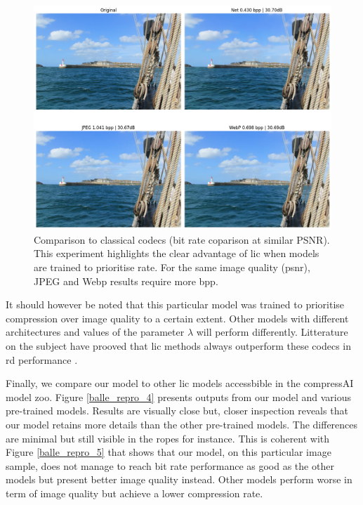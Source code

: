 \begin{figure}
    \centering
    \includegraphics[width=15cm]{img/balle_repro_psnr.png}
    \caption[Comparison to classical codecs (bit rate coparison at similar PSNR).]{Comparison to classical codecs (bit rate coparison at similar PSNR). This experiment highlights the clear advantage of \acrshort{lic} when models are trained to prioritise rate. For the same image quality (\acrshort{psnr}), JPEG and Webp results require more \acrshort{bpp}.}
    \label{balle_repro_3}
\end{figure}

It should however be noted that this particular model was trained to prioritise compression over image quality to a certain extent. Other models with different architectures and values of the parameter \(\lambda\) will perform differently. Litterature on the subject have prooved that \acrshort{lic} methods always outperform these codecs in \acrshort{rd} performance \cite{ballé2018variationalimagecompressionscale}.

Finally, we compare our model to other \acrshort{lic} models accessbible in the compressAI model zoo. Figure \ref{balle_repro_4} presents outputs from our model and various pre-trained models. Results are visually close but, closer inspection reveals that our model retains more details than the other pre-trained models. The differences are minimal but still visible in the ropes for instance. This is coherent with Figure \ref{balle_repro_5} that shows that our model, on this particular image sample, does not manage to reach bit rate performance as good as the other models but present better image quality instead. Other models perform worse in term of image quality but achieve a lower compression rate.

